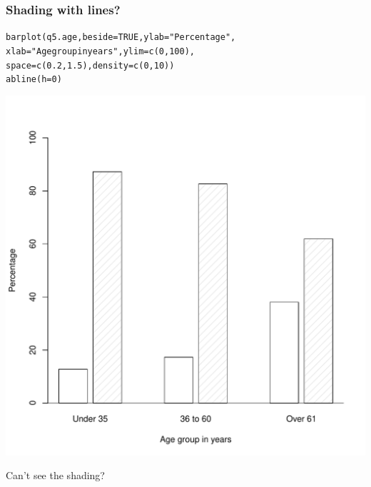 \documentclass{beamer}\usepackage[]{graphicx}\usepackage[]{color}
\makeatletter
\newcommand{\hlnum}[1]{\textcolor[rgb]{0.533,0,0.133}{#1}}%
\newcommand{\hlstr}[1]{\textcolor[rgb]{0.667,0.267,0}{#1}}%
\newcommand{\hlstd}[1]{\textcolor[rgb]{0,0,0}{#1}}%
\newcommand{\hlkwc}[1]{\textcolor[rgb]{0,0,0.4}{#1}}%
\newcommand{\hlkwd}[1]{\textcolor[rgb]{0,0.267,0.4}{#1}}%
\newenvironment{kframe}{%
 \def\at@end@of@kframe{}%
 \ifinner\ifhmode%
  \def\at@end@of@kframe{\end{minipage}}%
  \begin{minipage}{\columnwidth}%
 \fi\fi%
 \def\FrameCommand##1{\hskip\@totalleftmargin \hskip-\fboxsep
 \colorbox{shadecolor}{##1}\hskip-\fboxsep
     \hskip-\linewidth \hskip-\@totalleftmargin \hskip\columnwidth}%
 \MakeFramed {\advance\hsize-\width
   \@totalleftmargin\z@ \linewidth\hsize
   \@setminipage}}%
 {\par\unskip\endMakeFramed%
 \at@end@of@kframe}
\newenvironment{knitrout}{}{} %
\makeatother
\begin{document}
\begin{frame}[fragile]
  \frametitle{Shading with lines?}
\begin{knitrout}
\color{fgcolor}\begin{kframe}
\begin{alltt}
\hlkwd{barplot}\hlstd{(q5.age,} \hlkwc{beside} \hlstd{=} \hlnum{TRUE}\hlstd{,} \hlkwc{ylab} \hlstd{=} \hlstr{"Percentage"}\hlstd{,}
        \hlkwc{xlab} \hlstd{=} \hlstr{"Age group in years"}\hlstd{,} \hlkwc{ylim} \hlstd{=} \hlkwd{c}\hlstd{(}\hlnum{0}\hlstd{,} \hlnum{100}\hlstd{),}
        \hlkwc{space} \hlstd{=} \hlkwd{c}\hlstd{(}\hlnum{0.2}\hlstd{,} \hlnum{1.5}\hlstd{),} \hlkwc{density} \hlstd{=} \hlkwd{c}\hlstd{(}\hlnum{0}\hlstd{,} \hlnum{10}\hlstd{))}
\hlkwd{abline}\hlstd{(}\hlkwc{h} \hlstd{=} \hlnum{0}\hlstd{)}
\end{alltt}
\end{kframe}
\end{knitrout}
\vspace{-5mm}
\begin{knitrout}
\color{fgcolor}

{\centering \includegraphics[width=0.4\linewidth]{figure/bar4-1} 

}



\end{knitrout}
\vspace{-3mm}
\begin{center}
  Can't see the shading?
\end{center}
\end{frame}
\end{document}

